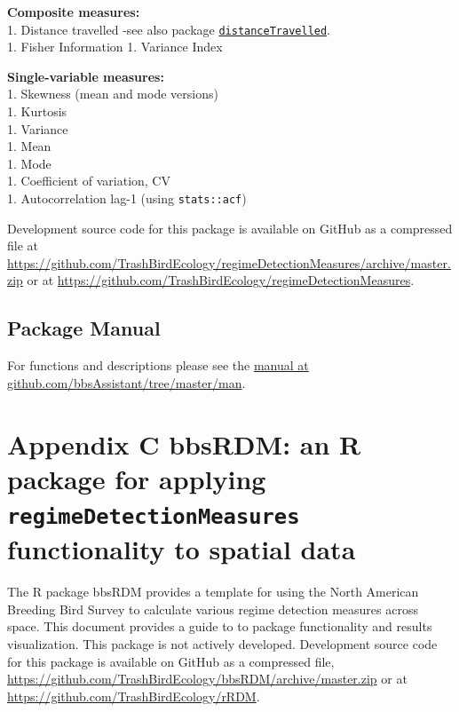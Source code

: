 \documentclass[12pt,twoside,openany]{reedthesis}
\begin{document}
\textbf{Composite measures:}\\
1. Distance travelled -see also package \href{https://github.com/TrashBirdEcology/distanceTravelled}{\texttt{distanceTravelled}}.\\
1. Fisher Information
1. Variance Index

\textbf{Single-variable measures:}\\
1. Skewness (mean and mode versions)\\
1. Kurtosis\\
1. Variance\\
1. Mean\\
1. Mode\\
1. Coefficient of variation, CV\\
1. Autocorrelation lag-1 (using \texttt{stats::acf})

Development source code for this package is available on GitHub as a compressed file at \url{https://github.com/TrashBirdEcology/regimeDetectionMeasures/archive/master.zip} or at \url{https://github.com/TrashBirdEcology/regimeDetectionMeasures}.

\hypertarget{package-manual-1}{%
\section{Package Manual}\label{package-manual-1}}

For functions and descriptions please see the \href{https://github.com/TrashBirdEcology/bbsAssistant/tree/master/man}{manual at github.com/bbsAssistant/tree/master/man}.

\hypertarget{bbsRDM}{%
\chapter*{\texorpdfstring{Appendix C bbsRDM: an R package for applying \texttt{regimeDetectionMeasures} functionality to spatial data}{Appendix C bbsRDM: an R package for applying regimeDetectionMeasures functionality to spatial data}}\label{bbsRDM}}

The R package bbsRDM provides a template for using the North American Breeding Bird Survey to calculate various regime detection measures across space. This document provides a guide to to package functionality and results visualization. This package is not actively developed. Development source code for this package is available on GitHub as a compressed file, \url{https://github.com/TrashBirdEcology/bbsRDM/archive/master.zip} or at \url{https://github.com/TrashBirdEcology/rRDM}.
\end{document}
